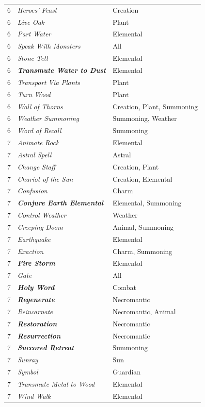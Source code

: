 \begin{multicols}{2}
\begin{tabular}{|p{}|p{}|p{}|}
6	& \textit{Heroes' Feast}	& Creation \\
\rowcolor[gray]{.9}6	& \textit{Live Oak}	& Plant \\
6	& \textit{Part Water}	& Elemental \\
\rowcolor[gray]{.9}6	& \textit{Speak With Monsters}	& All \\
6	& \textit{Stone Tell}	& Elemental \\
\rowcolor[gray]{.9}6	& \textbf{\textit{Transmute Water to Dust}}	& Elemental \\
6	& \textit{Transport Via Plants}	& Plant \\
\rowcolor[gray]{.9}6	& \textit{Turn Wood}	& Plant \\
6	& \textit{Wall of Thorns}	& Creation, Plant, Summoning \\
\rowcolor[gray]{.9}6	& \textit{Weather Summoning}	& Summoning, Weather \\
6	& \textit{Word of Recall}	& Summoning \\
\rowcolor[gray]{.9}7	& \textit{Animate Rock}	& Elemental \\
7	& \textit{Astral Spell}	& Astral \\
\rowcolor[gray]{.9}7	& \textit{Change Staff}	& Creation, Plant \\
7	& \textit{Chariot of the Sun}	& Creation, Elemental \\
\rowcolor[gray]{.9}7	& \textit{Confusion}	& Charm \\
7	& \textbf{\textit{Conjure Earth Elemental}}	& Elemental, Summoning \\
\rowcolor[gray]{.9}7	& \textit{Control Weather}	& Weather \\
7	& \textit{Creeping Doom}	& Animal, Summoning \\
\rowcolor[gray]{.9}7	& \textit{Earthquake}	& Elemental \\
7	& \textit{Exaction}	& Charm, Summoning \\
\rowcolor[gray]{.9}7	& \textbf{\textit{Fire Storm}}	& Elemental \\
7	& \textit{Gate}	& All \\
\rowcolor[gray]{.9}7	& \textbf{\textit{Holy Word}}	& Combat \\
7	& \textbf{\textit{Regenerate}}	& Necromantic \\
\rowcolor[gray]{.9}7	& \textit{Reincarnate}	& Necromantic, Animal \\
7	& \textbf{\textit{Restoration}}	& Necromantic \\
\rowcolor[gray]{.9}7	& \textbf{\textit{Resurrection}}	& Necromantic \\
7	& \textbf{\textit{Succored Retreat}}	& Summoning \\
\rowcolor[gray]{.9}7	& \textit{Sunray}	& Sun \\
7	& \textit{Symbol}	& Guardian \\
\rowcolor[gray]{.9}7	& \textit{Transmute Metal to Wood}	& Elemental \\
7	& \textit{Wind Walk}	& Elemental \\


\end{tabular}
\end{multicols}

